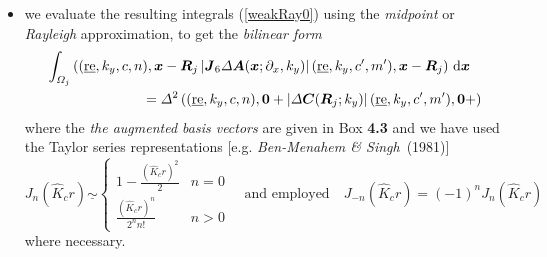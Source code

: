 \begin{itemize}
\begin{samepage}
\begin{eqnarray}
{\begin{array}{cccccccc}
{\mit \Delta}\chi & \displaystyle {\mit \Delta}\gamma & \displaystyle 0& \displaystyle 0& 
\displaystyle {\mit \Delta}\zeta & \displaystyle 0\\ \displaystyle 0& \displaystyle 
i{k}_{y} {\mit \Delta}\mu & \displaystyle 0& \displaystyle 0& \displaystyle 0& 
\displaystyle 0& \displaystyle 0& \displaystyle {\mit \Delta}\mu 
\end{array}}\right]\nonumber 
\end{eqnarray}
\end{samepage}
with all material contrast parameters evaluated at the mid point ${\bmi 
R}_j$ of ${\mit \Omega}_j$. The operator is {\em multiplicative\/}, with the material contrast parameters in 
(\ref{CdefAug}) defined (with reference to Table \ref{ATable}) by Table \ref{contrastTable}, so that 
${\mit \Delta }\zeta$ is the difference between $\zeta$ inside the inclusion and 
the value of $\zeta$ in the homogeneous background medium,  with 
analogous definitions for the remaining contrasts. 



\item we evaluate the resulting integrals (\ref{weakRay0}) using the {\em midpoint\/} or 
{\em Rayleigh\/}  
approximation, to get the {\em bilinear form\/}
\begin{eqnarray} \label{weakRay}
\lefteqn{
\int_{{\mit \Omega}_j}
\left( (\re,k_y,c,n),{\bmi x}-{\bmi R}_{j}\left|
{\bmi J}_{6}{{\mit \Delta} {\bmi A}}({\bmi x};{\partial 
}_{x},{k}_{y})\right|(\re,k_y,c^{\prime},m^{\prime}),
{\bmi x}-{\bmi R}_{j}\right)\, {\rm d}{\bmi x}
}\nonumber\\
&&\qquad\qquad\qquad ={\mit \Delta}^{2}  \left( (\re,k_y,c,n),{\bf 0}+\left|
{\mit \Delta}{\bmi C}({\bmi R}_j;k_y)
\right|(\re,k_y,c^{\prime},m^{\prime}),{\bf 0}+\right)
\end{eqnarray}
where the {\em the augmented basis vectors\/} are given in {\sc Box} {\bf  
4.3} and we have used the Taylor series 
representations [e.g. {\em Ben-Menahem \& Singh\/}~(1981)]
\[
{J}_{n}(\hat{K}_{c}r)\underline{\sim 
}\left\{{\begin{array}{cc}
1-{\frac{{\left({\hat{K}_{c}r}\right)}^{2}}{2}}&n=0\\ 
{\frac{{\left({\hat{K}_{c}r}\right)}^{n}}{{2}^{n}n!}}&n>0
\end{array}}\right.
\quad \mbox{and employed}  \quad
{J}_{-n}(\hat{K}_{c}r)=(-1)^n {J}_{n}(\hat{K}_{c}r)
\]
where necessary.
\end{itemize}

